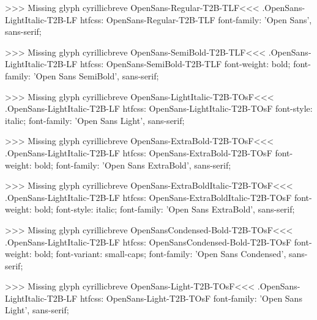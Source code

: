 >>>
Missing glyph	cyrillicbreve
\<OpenSans-Regular-T2B-TLF\><<<
.OpenSans-LightItalic-T2B-LF
htfcss:  OpenSans-Regular-T2B-TLF  font-family: 'Open Sans', sans-serif;

>>>
Missing glyph	cyrillicbreve
\<OpenSans-SemiBold-T2B-TLF\><<<
.OpenSans-LightItalic-T2B-LF
htfcss:  OpenSans-SemiBold-T2B-TLF  font-weight: bold; font-family: 'Open Sans SemiBold', sans-serif;

>>>
Missing glyph	cyrillicbreve
\<OpenSans-LightItalic-T2B-TOsF\><<<
.OpenSans-LightItalic-T2B-LF
htfcss:  OpenSans-LightItalic-T2B-TOsF  font-style: italic; font-family: 'Open Sans Light', sans-serif;

>>>
Missing glyph	cyrillicbreve
\<OpenSans-ExtraBold-T2B-TOsF\><<<
.OpenSans-LightItalic-T2B-LF
htfcss:  OpenSans-ExtraBold-T2B-TOsF  font-weight: bold; font-family: 'Open Sans ExtraBold', sans-serif;

>>>
Missing glyph	cyrillicbreve
\<OpenSans-ExtraBoldItalic-T2B-TOsF\><<<
.OpenSans-LightItalic-T2B-LF
htfcss:  OpenSans-ExtraBoldItalic-T2B-TOsF  font-weight: bold; font-style: italic; font-family: 'Open Sans ExtraBold', sans-serif;

>>>
Missing glyph	cyrillicbreve
\<OpenSansCondensed-Bold-T2B-TOsF\><<<
.OpenSans-LightItalic-T2B-LF
htfcss:  OpenSansCondensed-Bold-T2B-TOsF  font-weight: bold; font-variant: small-caps; font-family: 'Open Sans Condensed', sans-serif;

>>>
Missing glyph	cyrillicbreve
\<OpenSans-Light-T2B-TOsF\><<<
.OpenSans-LightItalic-T2B-LF
htfcss:  OpenSans-Light-T2B-TOsF  font-family: 'Open Sans Light', sans-serif;

